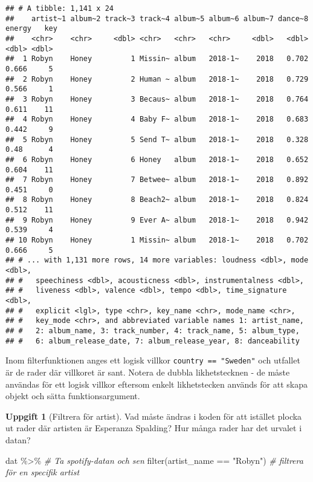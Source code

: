 \documentclass[
]{book}
\newenvironment{Shaded}{\begin{snugshade}}{\end{snugshade}}
\newcommand{\CommentTok}[1]{\textcolor[rgb]{0.56,0.35,0.01}{\textit{#1}}}
\newcommand{\FunctionTok}[1]{\textcolor[rgb]{0.00,0.00,0.00}{#1}}
\newcommand{\NormalTok}[1]{#1}
\newcommand{\SpecialCharTok}[1]{\textcolor[rgb]{0.00,0.00,0.00}{#1}}
\newcommand{\StringTok}[1]{\textcolor[rgb]{0.31,0.60,0.02}{#1}}
\theoremstyle{definition}
\theoremstyle{definition}
\theoremstyle{definition}
\newtheorem{exercise}{Uppgift}[chapter]
\theoremstyle{definition}
\theoremstyle{remark}
\begin{document}
\begin{verbatim}
## # A tibble: 1,141 x 24
##    artist~1 album~2 track~3 track~4 album~5 album~6 album~7 dance~8 energy   key
##    <chr>    <chr>     <dbl> <chr>   <chr>   <chr>     <dbl>   <dbl>  <dbl> <dbl>
##  1 Robyn    Honey         1 Missin~ album   2018-1~    2018   0.702  0.666     5
##  2 Robyn    Honey         2 Human ~ album   2018-1~    2018   0.729  0.566     1
##  3 Robyn    Honey         3 Becaus~ album   2018-1~    2018   0.764  0.611    11
##  4 Robyn    Honey         4 Baby F~ album   2018-1~    2018   0.683  0.442     9
##  5 Robyn    Honey         5 Send T~ album   2018-1~    2018   0.328  0.48      4
##  6 Robyn    Honey         6 Honey   album   2018-1~    2018   0.652  0.604    11
##  7 Robyn    Honey         7 Betwee~ album   2018-1~    2018   0.892  0.451     0
##  8 Robyn    Honey         8 Beach2~ album   2018-1~    2018   0.824  0.512    11
##  9 Robyn    Honey         9 Ever A~ album   2018-1~    2018   0.942  0.539     4
## 10 Robyn    Honey         1 Missin~ album   2018-1~    2018   0.702  0.666     5
## # ... with 1,131 more rows, 14 more variables: loudness <dbl>, mode <dbl>,
## #   speechiness <dbl>, acousticness <dbl>, instrumentalness <dbl>,
## #   liveness <dbl>, valence <dbl>, tempo <dbl>, time_signature <dbl>,
## #   explicit <lgl>, type <chr>, key_name <chr>, mode_name <chr>,
## #   key_mode <chr>, and abbreviated variable names 1: artist_name,
## #   2: album_name, 3: track_number, 4: track_name, 5: album_type,
## #   6: album_release_date, 7: album_release_year, 8: danceability
\end{verbatim}

Inom filterfunktionen anges ett logisk villkor \texttt{country\ ==\ "Sweden"} och utfallet är de rader där villkoret är sant. Notera de dubbla likhetstecknen - de måste användas för ett logisk villkor eftersom enkelt likhetstecken används för att skapa objekt och sätta funktionsargument.

\begin{exercise}[Filtrera för artist]

Vad måste ändras i koden för att istället plocka ut rader där artisten är Esperanza Spalding? Hur många rader har det urvalet i datan?

\begin{Shaded}
\begin{Highlighting}[]
\NormalTok{dat }\SpecialCharTok{\%\textgreater{}\%}                                \CommentTok{\# Ta spotify{-}datan och sen}
  \FunctionTok{filter}\NormalTok{(artist\_name }\SpecialCharTok{==} \StringTok{"Robyn"}\NormalTok{)       }\CommentTok{\# filtrera för en specifik artist}
\end{Highlighting}
\end{Shaded}

\end{exercise}
\end{document}

